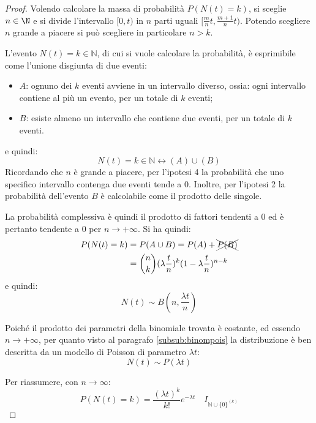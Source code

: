 \begin{proof}
	Volendo calcolare la massa di probabilità $P(N(t)=k)$, si sceglie $n\in\N$ e si divide l'intervallo $[0,t)$ in $n$ parti uguali $[\frac{m}{n}t,\frac{m+1}{n}t)$. Potendo scegliere $n$ grande a piacere si può scegliere in particolare $n>k$.

	L'evento $N(t)=k \in \mathbb{N}$, di cui si vuole calcolare la probabilità, è esprimibile come l'unione disgiunta di due eventi:
	\begin{itemize}
		\item $A$: ognuno dei $k$ eventi avviene in un intervallo diverso, ossia: ogni intervallo contiene al più un evento, per un totale di $k$ eventi;
		\item $B$: esiste almeno un intervallo che contiene due eventi, per un totale di $k$ eventi.
	\end{itemize}
	e quindi:
	\begin{equation*}
		N(t)=k \in \mathbb{N} \leftrightarrow (A) \cup (B)
	\end{equation*}
	Ricordando che $n$ è grande a piacere, per l'ipotesi 4 la probabilità che uno specifico intervallo contenga due eventi tende a $0$. 
	Inoltre, per l'ipotesi 2 la probabilità dell'evento $B$ è calcolabile come il prodotto delle singole. 
	
	La probabilità complessiva è quindi il prodotto di fattori tendenti a $0$ ed è pertanto tendente a $0$ per $n\to+\infty$. Si ha quindi:
	\begin{align*}
		P(N(t)=k) & = P (A \cup B) = P(A) +  \xcancel{P(B)}\\
				& = \binom{n}{k} (\lambda \frac{t}{n})^k (1 - \lambda \frac{t}{n})^{n-k}
	\end{align*}
e quindi:
\begin{equation*}
	N(t) \sim B(n, \frac{\lambda t}{n})
\end{equation*}


Poiché il prodotto dei parametri della binomiale trovata è costante, ed essendo $n\to+\infty$, per quanto visto al paragrafo \ref{subsub:binompois} la distribuzione è ben descritta da un modello di Poisson di parametro $\lambda t$:
	\begin{equation*}
		N(t) \sim P(\lambda t)
	\end{equation*}

Per riassumere, con $n \rightarrow \infty$:
\begin{equation*}
	P(N(t) = k) = \frac{(\lambda t)^k}{k!} e^{-\lambda t}\quad I_{\mathbb{N} \cup \{0\}^{(k)}} 
\end{equation*}


\end{proof}
